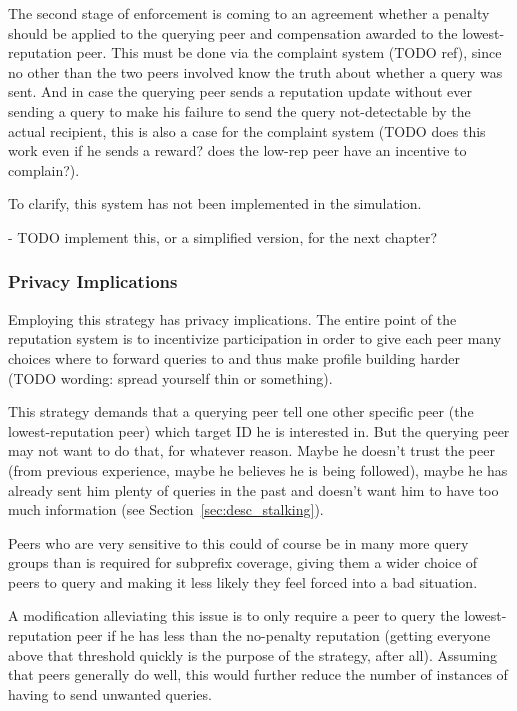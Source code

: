 The second stage of enforcement is coming to an agreement whether a penalty
should be applied to the querying peer and compensation awarded to the
lowest-reputation peer. This must be done via the complaint system (TODO ref),
since no other than the two peers involved know the truth about whether a query
was sent. And in case the querying peer sends a reputation update without ever
sending a query to make his failure to send the query not-detectable by the
actual recipient, this is also a case for the complaint system (TODO does this
work even if he sends a reward? does the low-rep peer have an incentive to
complain?).

To clarify, this system has not been implemented in the simulation.

- TODO implement this, or a simplified version, for the next chapter?

\subsubsection{Privacy Implications}
\label{sec:selection_overlap_rep_sorted_privacy}
Employing this strategy has privacy implications. The entire point of the
reputation system is to incentivize participation in order to give each peer
many choices where to forward queries to and thus make profile building harder
(TODO wording: spread yourself thin or something).

This strategy demands that a querying peer tell one other specific peer (the
lowest-reputation peer) which target ID he is interested in. But the querying
peer may not want to do that, for whatever reason. Maybe he doesn't trust the
peer (from previous experience, maybe he believes he is being followed), maybe
he has already sent him plenty of queries in the past and doesn't want him to
have too much information (see Section~\ref{sec:desc_stalking}).

Peers who are very sensitive to this could of course be in many more query
groups than is required for subprefix coverage, giving them a wider choice of
peers to query and making it less likely they feel forced into a bad situation.

A modification alleviating this issue is to only require a peer to query the
lowest-reputation peer if he has less than the no-penalty reputation (getting
everyone above that threshold quickly is the purpose of the strategy, after
all). Assuming that peers generally do well, this would further reduce the
number of instances of having to send unwanted queries.

